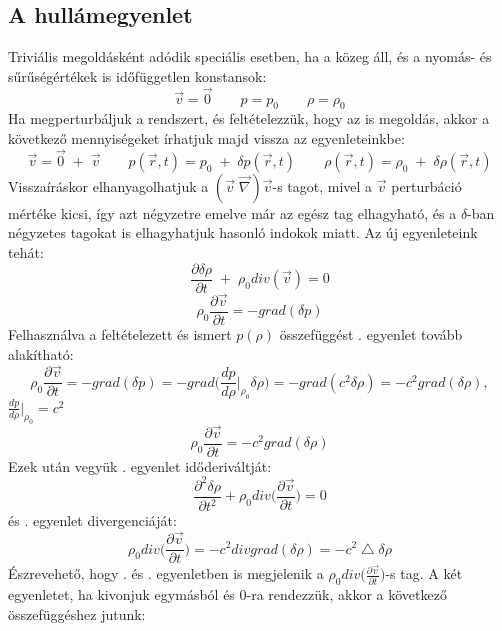 \documentclass[a4paper, titlepage]{article}
\begin{document}
\subsection*{A hullámegyenlet}
Triviális megoldásként adódik speciális esetben, ha a közeg áll, és a nyomás- és sűrűségértékek is időfüggetlen konstansok:
$$
\vec{v}=\vec{0}\qquad p=p_0\qquad\rho=\rho_0
$$
Ha megperturbáljuk a rendszert, és feltételezzük, hogy az is megoldás, akkor a következő mennyiségeket írhatjuk majd vissza az egyenleteinkbe:
$$
\vec{v}=\vec{0}\;+\;\vec{v}\qquad p(\vec{r},t)=p_0\;+\;\delta p(\vec{r},t)\qquad\rho(\vec{r},t)=\rho_0\;+\;\delta\rho(\vec{r},t)
$$
Visszaíráskor elhanyagolhatjuk a $(\vec{v}\;\vec{\nabla})\vec{v}$-s tagot, mivel a $\vec{v}$ perturbáció mértéke kicsi, így azt négyzetre emelve már az egész tag elhagyható, és a $\delta$-ban négyzetes tagokat is elhagyhatjuk hasonló indokok miatt. Az új egyenleteink tehát:
\begin{equation}
\label{eq:cont}
\frac{\partial\delta\rho}{\partial t}\;+\;\rho_0 div(\vec{v})=0
\end{equation}
\begin{equation}
\label{eq:rot}
\rho_0\frac{\partial \vec{v}}{\partial t}=-grad(\delta p)
\end{equation}
Felhasználva a feltételezett és ismert $p(\rho)$ összefüggést . egyenlet tovább alakítható:
$$
\rho_0\frac{\partial \vec{v}}{\partial t}=-grad(\delta p)=-grad\bigg(\frac{dp}{d\rho}\bigg\vert_{\rho_0}\delta\rho\bigg)=-grad(c^2\delta\rho)=-c^2grad(\delta\rho),
$$
$\frac{dp}{d\rho}\big\vert_{\rho_0}=c^2$
\begin{equation}
\label{eq:NS}
\rho_0\frac{\partial \vec{v}}{\partial t}=-c^2grad(\delta \rho)
\end{equation}
Ezek után vegyük . egyenlet időderiváltját:
\begin{equation}
\label{eq:(1)}
\frac{\partial^2 \delta\rho}{\partial t^2}+\rho_0 div\bigg(\frac{\partial \vec{v}}{\partial t}\bigg)=0
\end{equation}
és . egyenlet divergenciáját:
\begin{equation}
\label{eq:(2)}
\rho_0 div\bigg(\frac{\partial \vec{v}}{\partial t}\bigg)=-c^2divgrad(\delta \rho)=-c^2\bigtriangleup \delta \rho
\end{equation}
\newpage
\noindent Észrevehető, hogy . és . egyenletben is megjelenik a $\rho_0 div\big(\frac{\partial \vec{v}}{\partial t}\big)$-s tag. A két egyenletet, ha kivonjuk egymásból és 0-ra rendezzük, akkor a következő összefüggéshez jutunk:
\end{document}
